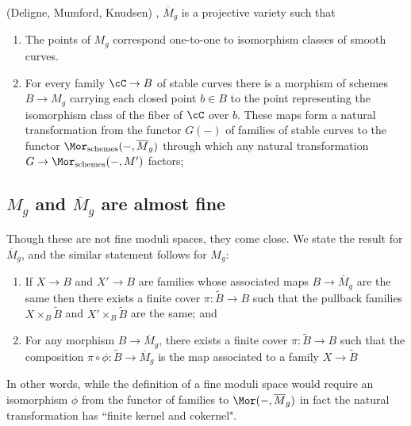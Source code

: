 \begin{theorem}(Deligne, Mumford, Knudsen) \cite{Deligne-Mumford}, \cite{MR702954}\label{DM is coarse}
$\overline M_g$ is a projective variety such that
\begin{enumerate}
 \item The points of $M_g$ correspond one-to-one to isomorphism classes of smooth curves.
 \item For every family $\cC \to B$ of stable curves there is a morphism of schemes $B\to M_g$ carrying
 each closed point  $b \in B$ to the point representing the isomorphism class of the fiber of $\cC$ over $b$. 
 These maps form a natural transformation from the functor $G(-)$ of families of stable curves to the functor 
 $\Mor_{\rm schemes}(-, \overline M_g)$ through which any natural transformation $G \to \Mor_{\rm schemes}(-, M')$
 factors;
\end{enumerate}
\end{theorem}


\subsection{$M_g$ and $\overline M_g$ are almost fine}\label{almost fine}

Though these are not fine moduli spaces, they come close. We state the result for $\overline M_g$, and the similar statement follows for $M_g$:

\begin{fact}
\begin{enumerate}
\item If $X \to B$ and $X' \to B$ are families whose associated maps $B \to \overline M_g$ are the same then there exists a finite cover $\pi : \tilde B \to B$ such that the pullback families $X \times_B \tilde B$ and $X' \times_B \tilde B$ are the same; and
\item For any morphism $B \to \overline M_g$, there exists a finite cover $\pi : \tilde B \to B$ such that the composition $\pi \circ \phi : \tilde B \to \overline M_g$ is the map associated to a family $X \to \tilde B$
\end{enumerate}
\end{fact}

In other words, while the definition of a fine moduli space would require an isomorphism $\phi$ from the functor of families
to $\Mor(-, \overline M_g)$ in fact the natural transformation has ``finite kernel and cokernel".

